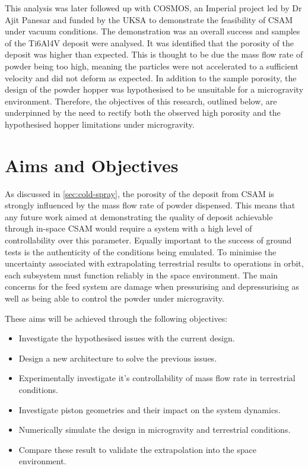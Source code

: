 This analysis was later followed up with COSMOS, an Imperial project led by Dr Ajit Panesar and funded by the UKSA to demonstrate the feasibility of CSAM under vacuum conditions. The demonstration was an overall success and samples of the Ti6Al4V deposit were analysed. It was identified that the porosity of the deposit was higher than expected. This is thought to be due the mass flow rate of powder being too high, meaning the particles were not accelerated to a sufficient velocity and did not deform as expected. In addition to the sample porosity, the design of the powder hopper was hypothesised to be unsuitable for a microgravity environment. Therefore, the objectives of this research, outlined below, are underpinned by the need to rectify both the observed high porosity and the hypothesised hopper limitations under microgravity.

\section{Aims and Objectives}
As discussed in \autoref{sec:cold-spray}, the porosity of the deposit from CSAM is strongly influenced by the mass flow rate of powder dispensed. This means that any future work aimed at demonstrating the quality of deposit achievable through in-space CSAM would require a system with a high level of controllability over this parameter. Equally important to the success of ground tests is the authenticity of the conditions being emulated. To minimise the uncertainty associated with extrapolating terrestrial results to operations in orbit, each subsystem must function reliably in the space environment. The main concerns for the feed system are damage when pressurising and depressurising as well as being able to control the powder under microgravity.

These aims will be achieved through the following objectives:
\begin{itemize}
    \item Investigate the hypothesised issues with the current design.
    \item Design a new architecture to solve the previous issues.
    \item Experimentally investigate it's controllability of mass flow rate in terrestrial conditions.
    \item Investigate piston geometries and their impact on the system dynamics.
    \item Numerically simulate the design in microgravity and terrestrial conditions.
    \item Compare these result to validate the extrapolation into the space environment. 
\end{itemize}



